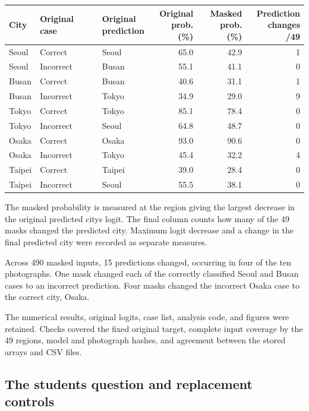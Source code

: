 \documentclass[11pt]{article}
\begin{document}
\begin{center}\small
\begin{tabular}{lllrrr}
\toprule
City & Original case & \shortstack{Original\\prediction} &
\shortstack{Original\\prob. (\%)} & \shortstack{Masked\\prob. (\%)} &
\shortstack{Prediction\\changes /49} \\
\midrule
Seoul & Correct & Seoul & 65.0 & 42.9 & 1 \\
Seoul & Incorrect & Busan & 55.1 & 41.1 & 0 \\
Busan & Correct & Busan & 40.6 & 31.1 & 1 \\
Busan & Incorrect & Tokyo & 34.9 & 29.0 & 9 \\
Tokyo & Correct & Tokyo & 85.1 & 78.4 & 0 \\
Tokyo & Incorrect & Seoul & 64.8 & 48.7 & 0 \\
Osaka & Correct & Osaka & 93.0 & 90.6 & 0 \\
Osaka & Incorrect & Tokyo & 45.4 & 32.2 & 4 \\
Taipei & Correct & Taipei & 39.0 & 28.4 & 0 \\
Taipei & Incorrect & Seoul & 55.5 & 38.1 & 0 \\
\bottomrule
\end{tabular}
\end{center}

The masked probability is measured at the region giving the largest decrease
in the original predicted city\textquotesingle{}s logit. The final column counts how many of
the 49 masks changed the predicted city. Maximum logit decrease and a change
in the final predicted city were recorded as separate measures.

Across 490 masked inputs, 15 predictions changed, occurring in four of the
ten photographs. One mask changed each of the correctly classified Seoul
and Busan cases to an incorrect prediction. Four masks changed the
incorrect Osaka case to the correct city, Osaka.

The numerical results, original logits, case list, analysis code, and figures
were retained. Checks covered the fixed original target, complete input
coverage by the 49 regions, model and photograph hashes, and agreement
between the stored arrays and CSV files.

\subsection{The student\textquotesingle{}s question and replacement controls}
\end{document}
